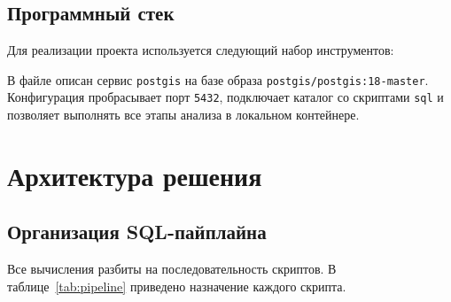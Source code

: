\documentclass[a4paper,article,14pt]{extarticle}
\begin{document}
\subsection{Программный стек}

Для реализации проекта используется следующий набор инструментов:

В файле  описан сервис \texttt{postgis} на базе
образа \texttt{postgis/postgis:18-master}. Конфигурация пробрасывает порт
\texttt{5432}, подключает каталог со скриптами \texttt{sql} и позволяет
выполнять все этапы анализа в локальном контейнере.

\section{Архитектура решения}

\subsection{Организация SQL-пайплайна}

Все вычисления разбиты на последовательность скриптов. В таблице~\ref{tab:pipeline} приведено назначение каждого
скрипта.
\end{document}
